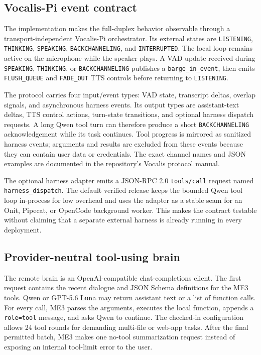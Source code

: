 \documentclass[sigconf,nonacm,balance=false]{acmart}
\begin{document}
\subsection{Vocalis-Pi event contract}

The implementation makes the full-duplex behavior observable through a
transport-independent Vocalis-Pi orchestrator. Its external states are
\texttt{LISTENING}, \texttt{THINKING}, \texttt{SPEAKING},
\texttt{BACKCHANNELING}, and \texttt{INTERRUPTED}. The local loop remains
active on the microphone while the speaker plays. A VAD update received during
\texttt{SPEAKING}, \texttt{THINKING}, or \texttt{BACKCHANNELING} publishes a
\texttt{barge\_in\_event}, then emits \texttt{FLUSH\_QUEUE} and
\texttt{FADE\_OUT} TTS controls before returning to \texttt{LISTENING}.

The protocol carries four input/event types: VAD state, transcript deltas,
overlap signals, and asynchronous harness events. Its output types are
assistant-text deltas, TTS control actions, turn-state transitions, and
optional harness dispatch requests. A long Qwen tool turn can therefore
produce a short \texttt{BACKCHANNELING} acknowledgement while its task
continues. Tool progress is mirrored as sanitized harness events; arguments
and results are excluded from these events because they can contain user data
or credentials. The exact channel names and JSON examples are documented in
the repository's Vocalis protocol manual.

The optional harness adapter emits a JSON-RPC 2.0 \texttt{tools/call} request
named \texttt{harness\_dispatch}. The default verified release keeps the
bounded Qwen tool loop in-process for low overhead and uses the adapter as a
stable seam for an Onit, Pipecat, or OpenCode background worker. This makes
the contract testable without claiming that a separate external harness is
already running in every deployment.

\subsection{Provider-neutral tool-using brain}

The remote brain is an OpenAI-compatible chat-completions client. The first
request contains the recent dialogue and JSON Schema definitions for the ME3
tools. Qwen or GPT-5.6 Luna may return assistant text or a list of function
calls. For every
call, ME3 parses the arguments, executes the local function, appends a
\texttt{role=tool} message, and asks Qwen to continue. The checked-in
configuration allows 24 tool rounds for demanding multi-file or web-app tasks.
After the final permitted batch, ME3 makes one no-tool summarization request
instead of exposing an internal tool-limit error to the user.
\end{document}
